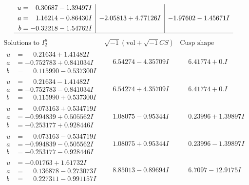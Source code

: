\documentclass[1p]{elsarticle_modified}
\theoremstyle{definition}
\newcommand{\I}{\sqrt{-1}}
\begin{document}
$$\begin{array}{c|c|c}
\begin{aligned}
u &= \phantom{-}0.30687 - 1.39497 I \\
a &= \phantom{-}1.16214 - 0.86430 I \\
b &= -0.32218 - 1.54762 I\end{aligned}
 & -2.05813 + 4.77126 I & -1.97602 - 1.45671 I\\
 \hline 
 \end{array}$$\newpage$$\begin{array}{c|c|c}  
\text{Solutions to }I^u_{2}& \I (\text{vol} + \sqrt{-1}CS) & \text{Cusp shape}\\
 \hline 
\begin{aligned}
u &= \phantom{-}0.21634 + 1.41482 I \\
a &= -0.752783 + 0.841034 I \\
b &= \phantom{-}0.115990 - 0.537300 I\end{aligned}
 & \phantom{-}6.54274 - 4.35709 I & \phantom{-}6.41774 + 0. I\phantom{ +0.000000I} \\ \hline\begin{aligned}
u &= \phantom{-}0.21634 - 1.41482 I \\
a &= -0.752783 - 0.841034 I \\
b &= \phantom{-}0.115990 + 0.537300 I\end{aligned}
 & \phantom{-}6.54274 + 4.35709 I & \phantom{-}6.41774 + 0. I\phantom{ +0.000000I} \\ \hline\begin{aligned}
u &= \phantom{-}0.073163 + 0.534719 I \\
a &= -0.994839 + 0.505562 I \\
b &= -0.253177 + 0.928446 I\end{aligned}
 & \phantom{-}1.08075 - 0.95344 I & \phantom{-}0.23996 + 1.39897 I \\ \hline\begin{aligned}
u &= \phantom{-}0.073163 - 0.534719 I \\
a &= -0.994839 - 0.505562 I \\
b &= -0.253177 - 0.928446 I\end{aligned}
 & \phantom{-}1.08075 + 0.95344 I & \phantom{-}0.23996 - 1.39897 I \\ \hline\begin{aligned}
u &= -0.01763 + 1.61732 I \\
a &= \phantom{-}0.136878 - 0.273073 I \\
b &= \phantom{-}0.227311 - 0.991157 I\end{aligned}
 & \phantom{-}8.85013 - 0.89694 I & \phantom{-}6.7097 - 12.9175 I \\ \hline\begin{aligned}

\end{aligned}
\end{array}$$
\end{document}

